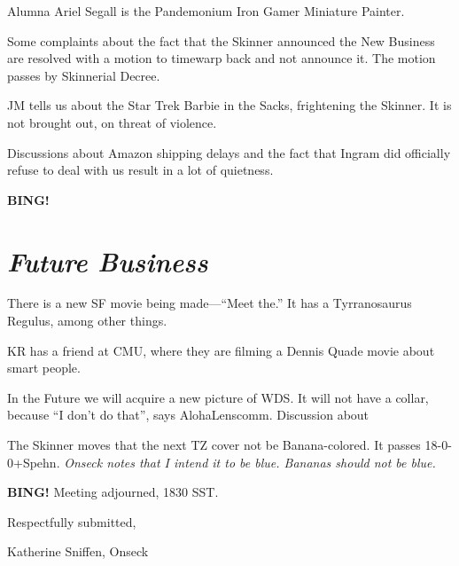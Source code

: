 \documentclass[10pt]{article}
\newcommand{\bing}{{\bf BING!} }
\newcommand{\goto}[1]{\bing \vskip 12pt \section*{{\em{#1}}}}
\begin{document}
Alumna Ariel Segall is the Pandemonium Iron Gamer Miniature Painter.

Some complaints about the fact that the Skinner announced the New
Business are resolved with a motion to timewarp back and not announce
it. The motion passes by Skinnerial Decree.

JM tells us about the Star Trek Barbie in the Sacks, frightening the
Skinner. It is not brought out, on threat of violence.

Discussions about Amazon shipping delays and the fact that Ingram did
officially refuse to deal with us result in a lot of quietness.

\goto{Future Business}
There is a new SF movie being made---``Meet the.'' It has a
Tyrranosaurus Regulus, among other things.

KR has a friend at CMU, where they are filming a Dennis Quade movie
about smart people.

In the Future we will acquire a new picture of WDS. It will not have a
collar, because ``I don't do that'', says AlohaLenscomm.
Discussion about 

The Skinner moves that the next TZ cover not be Banana-colored.
It passes 18-0-0+Spehn.
\emph{Onseck notes that I intend it to be blue. Bananas should not be blue.}


\bing
\noindent
Meeting adjourned, 1830 SST.

\vspace{18pt}

\centerline{Respectfully submitted,}
\centerline{Katherine Sniffen, Onseck}
\end{document}
